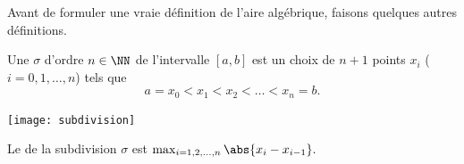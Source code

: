 \begin{frame}
  Avant de formuler une vraie définition de l'aire algébrique, faisons quelques autres définitions.\pause{}

\begin{definition}
  Une  \(\sigma\) d'ordre \(n\in \NN\) de l'intervalle $[a,b]$\pause{} est un choix de $n+1$ points $x_i$ ($i=0,1, \ldots, n$) tels que
  \begin{equation*}
    a=x_0 < x_1 < x_2 < \ldots < x_n=b.
  \end{equation*}
\end{definition}\pause{}
\begin{center}
  \texttt{[image: subdivision]}
\end{center}\pause{}
\begin{definition}
  Le  de la subdivision $\sigma$ est\pause{}
  \begin{math}
    \max_{i=1,2, \ldots,n} \abs{x_i - x_{i-1}}.
  \end{math}
\end{definition}
\end{frame}

